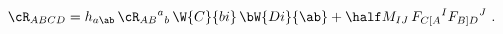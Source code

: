 \begin{equation}
  \cR_{ABCD} = h_{a\ab}\, \cR_{AB}{}^a{}_b\, \W{C}{bi}\, \bW{Di}{\ab}
  + \half M_{IJ}\, F_{C[A}{}^I F_{B]D}{}^J\ .
 \end{equation}

